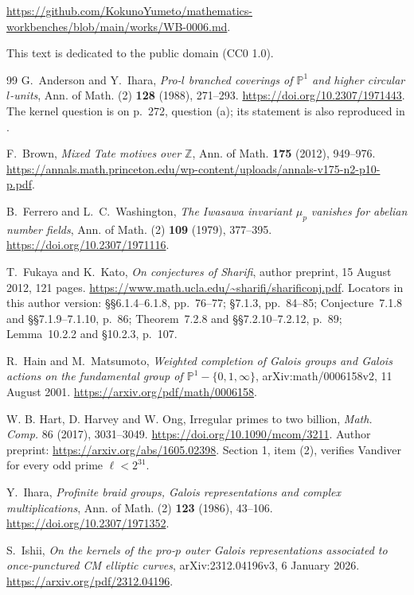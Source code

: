 \documentclass[11pt]{article}
\theoremstyle{definition}
\newcommand{\workbenchurl}{https://github.com/KokunoYumeto/mathematics-workbenches/blob/main/works/WB-0006.md}
\numberwithin{equation}{section}
\begin{document}
{\raggedright\smallskip\noindent\url{\workbenchurl}.\par}

\smallskip
This text is dedicated to the public domain (CC0 1.0).

\begingroup
\small
\begin{thebibliography}{99}
G.~Anderson and Y.~Ihara, \emph{Pro-$l$ branched coverings of $\mathbb P^1$ and higher circular $l$-units},
Ann. of Math. (2) \textbf{128} (1988), 271--293.
\url{https://doi.org/10.2307/1971443}.
The kernel question is on p.~272, question (a); its statement is also reproduced in
\cite[p.~2]{IshiiKernel2026}.

F.~Brown, \emph{Mixed Tate motives over $\mathbb Z$},
Ann. of Math. \textbf{175} (2012), 949--976.
\url{https://annals.math.princeton.edu/wp-content/uploads/annals-v175-n2-p10-p.pdf}.

B.~Ferrero and L.~C.~Washington,
\emph{The Iwasawa invariant $\mu_p$ vanishes for abelian number fields},
Ann. of Math. (2) \textbf{109} (1979), 377--395.
\url{https://doi.org/10.2307/1971116}.

T.~Fukaya and K.~Kato,
\emph{On conjectures of Sharifi}, author preprint,
15 August 2012, 121 pages.
\url{https://www.math.ucla.edu/~sharifi/sharificonj.pdf}.
Locators in this author version:
\S\S6.1.4--6.1.8, pp.~76--77;
\S7.1.3, pp.~84--85;
Conjecture~7.1.8 and \S\S7.1.9--7.1.10, p.~86;
Theorem~7.2.8 and \S\S7.2.10--7.2.12, p.~89;
Lemma~10.2.2 and \S10.2.3, p.~107.

R.~Hain and M.~Matsumoto, \emph{Weighted completion of Galois groups
and Galois actions on the fundamental group of $\mathbb P^1-\{0,1,\infty\}$},
arXiv:math/0006158v2, 11 August 2001.
\url{https://arxiv.org/pdf/math/0006158}.

W. B. Hart, D. Harvey and W. Ong,
Irregular primes to two billion,
\emph{Math. Comp.} 86 (2017), 3031--3049.
\url{https://doi.org/10.1090/mcom/3211}.
Author preprint:
\url{https://arxiv.org/abs/1605.02398}.
Section 1, item (2), verifies Vandiver for every odd prime
\(\ell<2^{31}\).

Y.~Ihara, \emph{Profinite braid groups, Galois representations and complex multiplications},
Ann. of Math. (2) \textbf{123} (1986), 43--106.
\url{https://doi.org/10.2307/1971352}.

S.~Ishii, \emph{On the kernels of the pro-$p$ outer Galois representations
associated to once-punctured CM elliptic curves},
arXiv:2312.04196v3, 6 January 2026.
\url{https://arxiv.org/pdf/2312.04196}.


\end{thebibliography}
\end{document}
